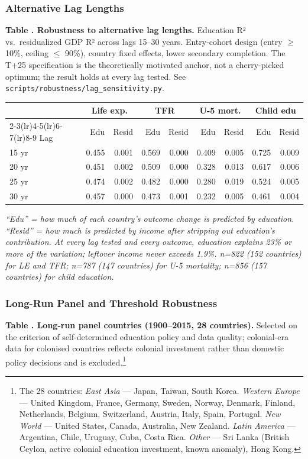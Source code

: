 \documentclass[12pt,letterpaper]{article}
\begin{document}
{\subsubsection{Alternative Lag Lengths}\label{appendix-lag-sensitivity}

\label{tab:a2}\textbf{Table \thetable. Robustness to alternative lag lengths.} Education R²
vs.\ residualized GDP R² across lags 15--30 years. Entry-cohort design
(entry $\geq$ 10\%, ceiling $\leq$ 90\%), country fixed effects, lower
secondary completion. The T+25 specification is the theoretically
motivated anchor, not a cherry-picked optimum; the result holds at every
lag tested. See \texttt{scripts/robustness/lag\_sensitivity.py}.

\begin{longtable}[]{@{}lrrrrrrrr@{}}
\toprule
& \multicolumn{2}{c}{Life exp.} & \multicolumn{2}{c}{TFR}
& \multicolumn{2}{c}{U-5 mort.} & \multicolumn{2}{c}{Child edu} \\
\cmidrule(lr){2-3}\cmidrule(lr){4-5}\cmidrule(lr){6-7}\cmidrule(lr){8-9}
Lag & Edu & Resid & Edu & Resid & Edu & Resid & Edu & Resid \\
\midrule
\endhead
15 yr & 0.455 & 0.001 & 0.569 & 0.000 & 0.409 & 0.005 & 0.725 & 0.009 \\
20 yr & 0.451 & 0.002 & 0.509 & 0.000 & 0.328 & 0.013 & 0.617 & 0.006 \\
25 yr & 0.474 & 0.002 & 0.482 & 0.000 & 0.280 & 0.019 & 0.524 & 0.005 \\
30 yr & 0.457 & 0.000 & 0.473 & 0.001 & 0.232 & 0.005 & 0.461 & 0.004 \\
\bottomrule
\end{longtable}

\emph{``Edu'' = how much of each country's outcome change is predicted by
education. ``Resid'' = how much is predicted by income after stripping
out education's contribution. At every lag tested and every outcome,
education explains 23\% or more of the variation; leftover income never
exceeds 1.9\%. n=822 (152 countries) for LE and TFR; n=787 (147
countries) for U-5 mortality; n=856 (157 countries) for child education.}

\subsubsection{Long-Run Panel and Threshold Robustness}\label{appendix-threshold-long-run}

\label{tab:a3}\textbf{Table \thetable. Long-run panel countries (1900--2015, 28 countries).}
Selected on the criterion of self-determined education policy and data
quality; colonial-era data for colonised countries reflects colonial
investment rather than domestic policy decisions and is excluded.\footnote{The
28 countries: \emph{East Asia} --- Japan, Taiwan, South Korea.
\emph{Western Europe} --- United Kingdom, France, Germany, Sweden,
Norway, Denmark, Finland, Netherlands, Belgium, Switzerland, Austria,
Italy, Spain, Portugal. \emph{New World} --- United States, Canada,
Australia, New Zealand. \emph{Latin America} --- Argentina, Chile,
Uruguay, Cuba, Costa Rica. \emph{Other} --- Sri Lanka (British Ceylon,
active colonial education investment, known anomaly), Hong Kong.}

}
\end{document}
